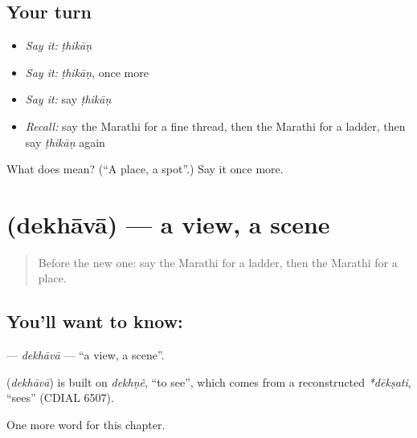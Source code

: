 \subsection*{Your turn}
\begin{itemize}
\raggedright
  \item \emph{Say it:} \emph{ṭhikāṇ}
  \item \emph{Say it:} \emph{ṭhikāṇ}, once more
  \item \emph{Say it:} say \emph{ṭhikāṇ}
  \item \emph{Recall:} say the Marathi for a fine thread, then the Marathi for a ladder, then say \emph{ṭhikāṇ} again
\end{itemize}

\begin{tcolorbox}[breakable,colback=teal!4,colframe=teal!35!black,title={Before you move on}]
What does  mean? (\textquotedblleft{}A place, a spot\textquotedblright{}.) Say it once more.
\end{tcolorbox}
\section[\texorpdfstring{\mr{देखावा} (dekhāvā)}{देखावा (dekhāvā)}]{ (dekhāvā) — a view, a scene}

\label{lesson:MR-C243-dekhava}



\begin{quote}
Before the new one: say the Marathi for a ladder, then the Marathi for a place.
\end{quote}

\subsection*{You'll want to know: }
\textbf{} — \emph{dekhāvā} — \textquotedblleft{}a view, a scene\textquotedblright{}.

\begin{cousinweb}
\textbf{} (\emph{dekhāvā}) is built on \emph{dekhṇẽ}, \textquotedblleft{}to see\textquotedblright{}, which comes from a reconstructed \emph{*dēkṣati}, \textquotedblleft{}sees\textquotedblright{} (CDIAL 6507).
\end{cousinweb}

\begin{grammarlens}[title={What you've built}]
One more word for this chapter.
\end{grammarlens}


